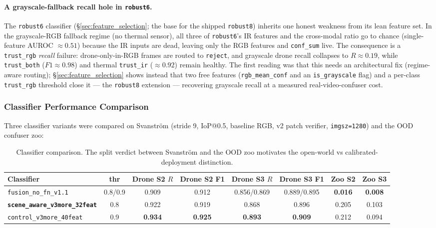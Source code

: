 \paragraph{A grayscale-fallback recall hole in \texttt{robust6}.}
The \texttt{robust6} classifier (\S\ref{sec:feature_selection}; the base for the shipped \texttt{robust8}) inherits one honest weakness from its lean feature set. In the grayscale-RGB fallback regime (no thermal sensor), all three of \texttt{robust6}'s IR features and the cross-modal ratio go to chance (single-feature AUROC $\approx 0.51$) because the IR inputs are dead, leaving only the RGB features and \texttt{conf\_sum} live. The consequence is a \texttt{trust\_rgb} \emph{recall} failure: drone-only-in-RGB frames are routed to \texttt{reject}, and grayscale drone recall collapses to $R\approx0.19$, while \texttt{trust\_both} ($F1\approx0.98$) and thermal \texttt{trust\_ir} ($\approx0.92$) remain healthy. The first reading was that this needs an architectural fix (regime-aware routing); \S\ref{sec:feature_selection} shows instead that two free features (\texttt{rgb\_mean\_conf} and an \texttt{is\_grayscale} flag) and a per-class \texttt{trust\_rgb} threshold close it --- the \texttt{robust8} extension --- recovering grayscale recall at a measured real-video-confuser cost.

\subsubsection{Classifier Performance Comparison}
\label{sec:classifier_compare}

Three classifier variants were compared on Svanstr\"om (stride 9, IoP@0.5, baseline RGB, v2 patch verifier, \texttt{imgsz=1280}) and the OOD confuser zoo:

\begin{table}[htbp]
    \centering
    \caption{Classifier comparison. The split verdict between Svanstr\"om and the OOD zoo motivates the open-world vs calibrated-deployment distinction.}
    \label{tab:classifiers}
    \begin{tabular}{lccccccc}
        \toprule
        Classifier & thr & Drone S2 $R$ & Drone S2 F1 & Drone S3 $R$ & Drone S3 F1 & Zoo S2 & Zoo S3 \\
        \midrule
        \texttt{fusion\_no\_fn\_v1.1}        & 0.8/0.9 & 0.909 & 0.912 & 0.856/0.869 & 0.889/0.895 & \textbf{0.016} & \textbf{0.008} \\
        \textbf{\texttt{scene\_aware\_v3more\_32feat}} & 0.8 & 0.922 & 0.919 & 0.868 & 0.896 & 0.205 & 0.103 \\
        \texttt{control\_v3more\_40feat} & 0.9 & \textbf{0.934} & \textbf{0.925} & \textbf{0.893} & \textbf{0.909} & 0.212 & 0.094 \\
        \bottomrule
    \end{tabular}
\end{table}

